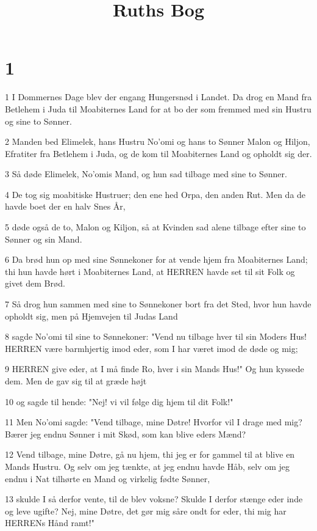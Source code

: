 

\title{Ruths Bog}


\chapter{1}

\par 1 I Dommernes Dage blev der engang Hungersnød i Landet. Da drog en Mand fra Betlehem i Juda til Moabiternes Land for at bo der som fremmed med sin Hustru og sine to Sønner.
\par 2 Manden bed Elimelek, hans Hustru No'omi og hans to Sønner Malon og Hiljon, Efratiter fra Betlehem i Juda, og de kom til Moabiternes Land og opholdt sig der.
\par 3 Så døde Elimelek, No'omis Mand, og hun sad tilbage med sine to Sønner.
\par 4 De tog sig moabitiske Hustruer; den ene hed Orpa, den anden Rut. Men da de havde boet der en halv Snes År,
\par 5 døde også de to, Malon og Kiljon, så at Kvinden sad alene tilbage efter sine to Sønner og sin Mand.
\par 6 Da brød hun op med sine Sønnekoner for at vende hjem fra Moabiternes Land; thi hun havde hørt i Moabiternes Land, at HERREN havde set til sit Folk og givet dem Brød.
\par 7 Så drog hun sammen med sine to Sønnekoner bort fra det Sted, hvor hun havde opholdt sig, men på Hjemvejen til Judas Land
\par 8 sagde No'omi til sine to Sønnekoner: "Vend nu tilbage hver til sin Moders Hus! HERREN være barmhjertig imod eder, som I har været imod de døde og mig;
\par 9 HERREN give eder, at I må finde Ro, hver i sin Mands Hus!" Og hun kyssede dem. Men de gav sig til at græde højt
\par 10 og sagde til hende: "Nej! vi vil følge dig hjem til dit Folk!"
\par 11 Men No'omi sagde: "Vend tilbage, mine Døtre! Hvorfor vil I drage med mig? Bærer jeg endnu Sønner i mit Skød, som kan blive eders Mænd?
\par 12 Vend tilbage, mine Døtre, gå nu hjem, thi jeg er for gammel til at blive en Mands Hustru. Og selv om jeg tænkte, at jeg endnu havde Håb, selv om jeg endnu i Nat tilhørte en Mand og virkelig fødte Sønner,
\par 13 skulde I så derfor vente, til de blev voksne? Skulde I derfor stænge eder inde og leve ugifte? Nej, mine Døtre, det gør mig såre ondt for eder, thi mig har HERRENs Hånd ramt!"

